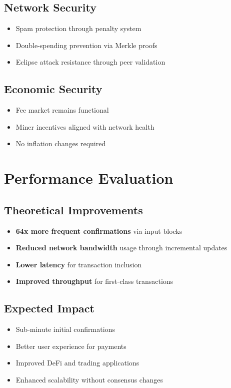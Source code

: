 \documentclass{llncs}
\begin{document}
\subsection{Network Security}

\begin{itemize}
\item Spam protection through penalty system
\item Double-spending prevention via Merkle proofs
\item Eclipse attack resistance through peer validation
\end{itemize}

\subsection{Economic Security}

\begin{itemize}
\item Fee market remains functional
\item Miner incentives aligned with network health
\item No inflation changes required
\end{itemize}

\section{Performance Evaluation}

\subsection{Theoretical Improvements}

\begin{itemize}
\item \textbf{64x more frequent confirmations} via input blocks
\item \textbf{Reduced network bandwidth} usage through incremental updates
\item \textbf{Lower latency} for transaction inclusion
\item \textbf{Improved throughput} for first-class transactions
\end{itemize}

\subsection{Expected Impact}

\begin{itemize}
\item Sub-minute initial confirmations
\item Better user experience for payments
\item Improved DeFi and trading applications
\item Enhanced scalability without consensus changes
\end{itemize}
\end{document}
